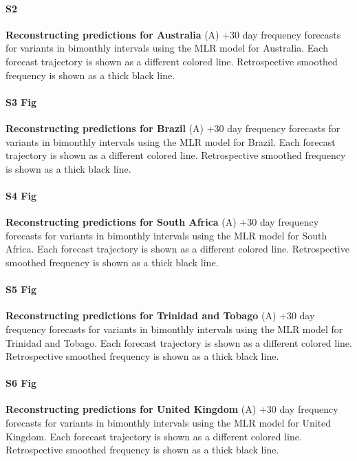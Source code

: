 \documentclass[10pt,letterpaper]{article}
\begin{document}
\paragraph*{S2}
\label{fig:S2}
{\bf Reconstructing predictions for Australia}
(A) +30 day frequency forecasts for variants in bimonthly intervals using the MLR model for Australia.
		Each forecast trajectory is shown as a different colored line.
		Retrospective smoothed frequency is shown as a thick black line.

\paragraph*{S3 Fig}
\label{fig:S3}
{\bf Reconstructing predictions for Brazil}
(A) +30 day frequency forecasts for variants in bimonthly intervals using the MLR model for Brazil.
		Each forecast trajectory is shown as a different colored line.
		Retrospective smoothed frequency is shown as a thick black line.

\paragraph*{S4 Fig}
\label{fig:S4}
{\bf Reconstructing predictions for South Africa}
(A) +30 day frequency forecasts for variants in bimonthly intervals using the MLR model for South Africa.
		Each forecast trajectory is shown as a different colored line.
		Retrospective smoothed frequency is shown as a thick black line.

\paragraph*{S5 Fig}
\label{fig:S4}
{\bf Reconstructing predictions for Trinidad and Tobago}
(A) +30 day frequency
forecasts for variants in bimonthly intervals using the MLR model for Trinidad and Tobago. Each
forecast trajectory is shown as a different colored line. Retrospective smoothed frequency is shown
as a thick black line.

\paragraph*{S6 Fig}
\label{fig:S6}
{\bf Reconstructing predictions for United Kingdom}
(A) +30 day frequency forecasts for variants in bimonthly intervals using the MLR model for United Kingdom.
		Each forecast trajectory is shown as a different colored line.
		Retrospective smoothed frequency is shown as a thick black line.
\end{document}
